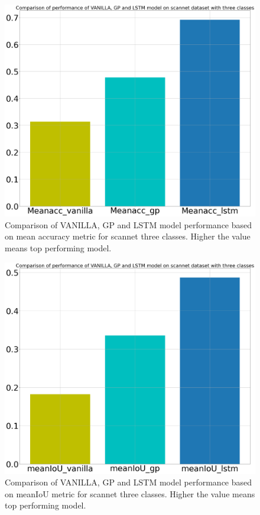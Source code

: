 	\begin{figure}
		\centering
		\includegraphics[width=12cm]{images/three_classes_meanacc.png}
		\caption{Comparison of VANILLA, GP and LSTM model performance based on mean accuracy metric for scannet three classes. Higher the value means top performing model.}
		\label{fig:performance_metric_three_classes_unet}
	\end{figure}

	\begin{figure}
		\centering
		\includegraphics[width=12cm]{images/three_classes_meanIoU.png}
		\caption{Comparison of VANILLA, GP and LSTM model performance based on  meanIoU metric for scannet three classes. Higher the value means top performing model.}
		\label{fig:performance_metric_three_classes_unet}
	\end{figure}

